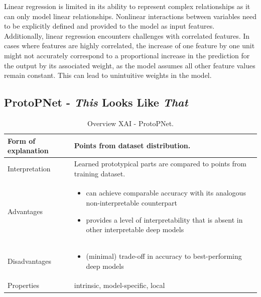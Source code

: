 Linear regression is limited in its ability to represent complex relationships as it can only model linear relationships. Nonlinear interactions between variables need to be explicitly defined and provided to the model as input features. \\
Additionally, linear regression encounters challenges with correlated features. In cases where features are highly correlated, the increase of one feature by one unit might not accurately correspond to a proportional increase in the prediction for the output by its associated weight, as the model assumes all other feature values remain constant. This can lead to unintuitive weights in the model.\cite{molnar2022}

\subsection{ProtoPNet - \textit{This} Looks Like \textit{That}}\label{sec:ProtoPNet}

\begin{table}[H]
  \centering
  \begin{tabular}{|p{}|p{}|}
    \hline
    Form of \newline explanation & Points from dataset distribution.
    \\
    
    \hline
    Interpretation & Learned prototypical parts are compared to points from training dataset.
     \\
 
    \hline
    Advantages &
    \begin{itemize}[nosep, left=0em]
        \item can achieve comparable accuracy with its analogous non-interpretable counterpart
        \item provides a level of interpretability that is absent in other interpretable deep models    
    \end{itemize} \\
    
    \hline
    Disadvantages &
    \begin{itemize}[nosep, left=0em]
        \item (minimal) trade-off in accuracy to best-performing deep models
    \end{itemize} \\
    
    \hline
    Properties & intrinsic, model-specific, local
      \\
    
    \hline
  \end{tabular}
  \caption[Overview XAI - ProtoPNet]{Overview XAI - ProtoPNet.\cite{NEURIPS2019_adf7ee2d}}
  \label{tab:XAIProtoPNet}
\end{table}

